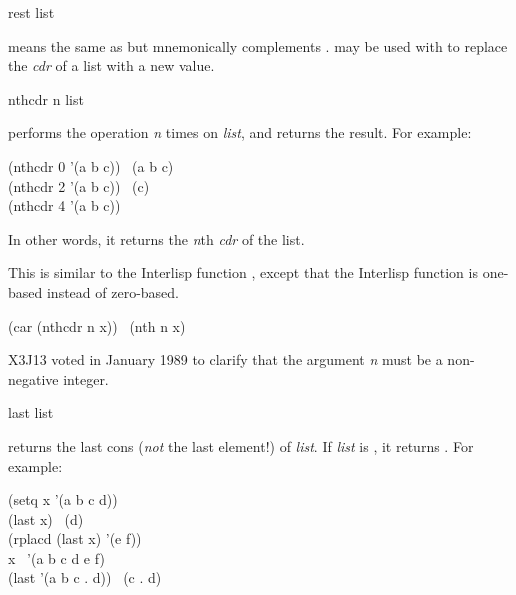\begin{defun}[Function]
rest list

 means the same as  but mnemonically complements .
 may be used with  to replace the {\it cdr} of a list
with a new value.
\end{defun}

\begin{defun}[Function]
nthcdr n list

 performs the  operation {\it n} times
on {\it list}, and returns the result.
For example:
\begin{lisp}
(nthcdr 0 '(a b c)) \EV\ (a b c) \\
(nthcdr 2 '(a b c)) \EV\ (c) \\
(nthcdr 4 '(a b c)) \EV\ {\emptylist}
\end{lisp}
In other words, it returns the {\it n}th {\it cdr} of the list.

\beforenoterule
\begin{incompatibility}
This is similar to the Interlisp function ,
except that the Interlisp function is one-based instead of zero-based.
\end{incompatibility}
\afternoterule

\begin{lisp}
(car (nthcdr n x)) \EQ\ (nth n x)
\end{lisp}
\begin{new}
X3J13 voted in January 1989
to clarify that the argument {\it n}
must be a non-negative integer.
\end{new}

\end{defun}

\begin{obsolete}
\begin{defun}[Function]
last list

 returns the last cons ({\it not} the last element!) of {\it list}.
If {\it list} is {\emptylist}, it returns {\emptylist}.
For example:
\begin{lisp}
(setq x '(a b c d)) \\
(last x) \EV\ (d) \\
(rplacd (last x) '(e f)) \\
x \EV\ '(a b c d e f) \\
(last '(a b c . d)) \EV\ (c . d)
\end{lisp}
\end{defun}
\end{obsolete}

